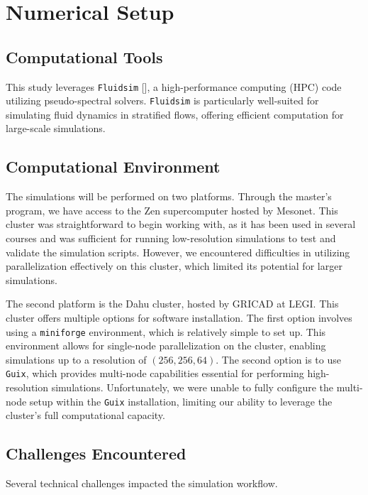 \documentclass[final,5p,times,twocolumn,authoryear]{elsarticle}
\begin{document}
\section{Numerical Setup}

\subsection{Computational Tools}

This study leverages \texttt{Fluidsim} [\cite{fluiddyn}], a high-performance computing (HPC) code utilizing pseudo-spectral solvers. \texttt{Fluidsim} is particularly well-suited for simulating fluid dynamics in stratified flows, offering efficient computation for large-scale simulations.

\subsection{Computational Environment}

The simulations will be performed on two platforms. Through the master’s program, we have access to the Zen supercomputer hosted by Mesonet. This cluster was straightforward to begin working with, as it has been used in several courses and was sufficient for running low-resolution simulations to test and validate the simulation scripts. However, we encountered difficulties in utilizing parallelization effectively on this cluster, which limited its potential for larger simulations.

The second platform is the Dahu cluster, hosted by GRICAD at LEGI. This cluster offers multiple options for software installation. The first option involves using a \texttt{miniforge} environment, which is relatively simple to set up. This environment allows for single-node parallelization on the cluster, enabling simulations up to a resolution of $(256, 256, 64)$. The second option is to use \texttt{Guix}, which provides multi-node capabilities essential for performing high-resolution simulations. Unfortunately, we were unable to fully configure the multi-node setup within the \texttt{Guix} installation, limiting our ability to leverage the cluster’s full computational capacity.

\subsection{Challenges Encountered}

Several technical challenges impacted the simulation workflow.
\end{document}
